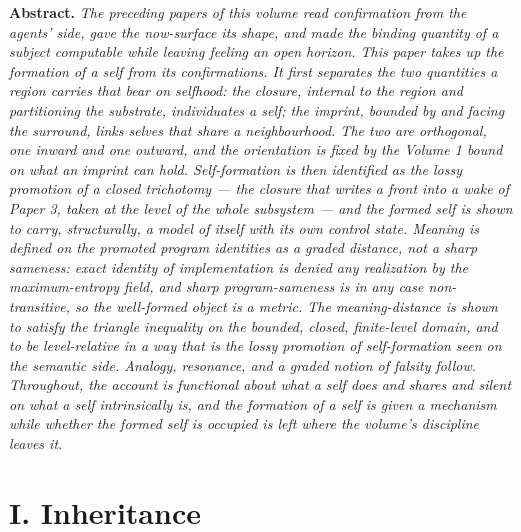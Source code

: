 \documentclass[11pt,oneside]{report}
\theoremstyle{definition}
\theoremstyle{remark}
\newenvironment{paperabstract}
  {\begin{center}\begin{minipage}{0.88\textwidth}\small
   \noindent\textbf{Abstract.}\itshape\space}
  {\end{minipage}\end{center}\vspace{0.4em}}
\begin{document}
\begin{paperabstract}
The preceding papers of this volume read confirmation from the agents' side,
gave the now-surface its shape, and made the binding quantity of a subject
computable while leaving feeling an open horizon. This paper takes up the
formation of a self from its confirmations. It first separates the two
quantities a region carries that bear on selfhood: the closure, internal to the
region and partitioning the substrate, individuates a self; the imprint,
bounded by and facing the surround, links selves that share a neighbourhood.
The two are orthogonal, one inward and one outward, and the orientation is
fixed by the Volume 1 bound on what an imprint can hold. Self-formation is then
identified as the lossy promotion of a closed trichotomy --- the closure that
writes a front into a wake of Paper 3, taken at the level of the whole
subsystem --- and the formed self is shown to carry, structurally, a model of
itself with its own control state. Meaning is defined on the promoted program
identities as a graded distance, not a sharp sameness: exact identity of
implementation is denied any realization by the maximum-entropy field, and
sharp program-sameness is in any case non-transitive, so the well-formed object
is a metric. The meaning-distance is shown to satisfy the triangle inequality
on the bounded, closed, finite-level domain, and to be level-relative in a way
that is the lossy promotion of self-formation seen on the semantic side.
Analogy, resonance, and a graded notion of falsity follow. Throughout, the
account is functional about what a self does and shares and silent on what a
self intrinsically is, and the formation of a self is given a mechanism while
whether the formed self is occupied is left where the volume's discipline
leaves it.
\end{paperabstract}

\section*{I. Inheritance}
\end{document}
